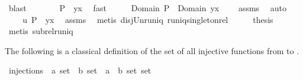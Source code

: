 \begin{isabellebody}
\ blast\isanewline
\ \ \isamarkupfalse%
\ \isamarkupfalse%
\ {\isachardoublequoteopen}{\isachardot}{\isachardot}{\isachardot}\ {\isacharequal}\ P{\isacharcircum}{\isacharminus}{}\ {\isasymunion}\ {\isacharbraceleft}{\isacharparenleft}y{\isacharcomma}x{\isacharparenright}{\isacharbraceright}{\isachardoublequoteclose}\ \isamarkupfalse%
\ fast\isanewline
\ \ \isamarkupfalse%
\ \isamarkupfalse%
\ {\isachardoublequoteopen}Domain\ {\isacharparenleft}P{\isacharcircum}{\isacharminus}{}{\isacharparenright}\ {\isasyminter}\ Domain\ {\isacharbraceleft}{\isacharparenleft}y{\isacharcomma}x{\isacharparenright}{\isacharbraceright}\ {\isacharequal}\ {\isacharbraceleft}{\isacharbraceright}{\isachardoublequoteclose}\ \isamarkupfalse%
\ assms{\isacharparenleft}{}{\isacharparenright}\ \isamarkupfalse%
\ auto\isanewline
\ \ \isamarkupfalse%
\ \isamarkupfalse%
\ \isamarkupfalse%
\ {\isachardoublequoteopen}{\isacharquery}u\ {\isacharparenleft}P{\isacharcircum}{\isacharminus}{}\ {\isasymunion}\ {\isacharbraceleft}{\isacharparenleft}y{\isacharcomma}x{\isacharparenright}{\isacharbraceright}{\isacharparenright}{\isachardoublequoteclose}\ \isamarkupfalse%
\ assms{\isacharparenleft}{}{\isacharparenright}\ \isamarkupfalse%
\ {\isacharparenleft}metis\ disj{\isacharunderscore}Un{\isacharunderscore}runiq\ runiq{\isacharunderscore}singleton{\isacharunderscore}rel{\isacharparenright}\isanewline
\ \ \isamarkupfalse%
\ \isamarkupfalse%
\ {\isacharquery}thesis\ \isamarkupfalse%
\ {\isacharparenleft}metis\ subrel{\isacharunderscore}runiq{\isacharparenright}\isanewline
{}\isamarkupfalse%
%
\endisatagproof
{\isafoldproof}%
%
\isadelimproof
%
\endisadelimproof
%
\isamarkuptrue%
%
\begin{isamarkuptext}%
The following is a classical definition of the set of all injective functions from  to .%
\end{isamarkuptext}%
\isamarkuptrue%
\isamarkupfalse%
\ injections\ {\isacharcolon}{\isacharcolon}\ {\isachardoublequoteopen}{\isacharprime}a\ set\ {\isasymRightarrow}\ {\isacharprime}b\ set\ {\isasymRightarrow}\ {\isacharparenleft}{\isacharprime}a\ {\isasymtimes}\ {\isacharprime}b{\isacharparenright}\ set\ set{\isachardoublequoteclose}\isanewline

\end{isabellebody}
